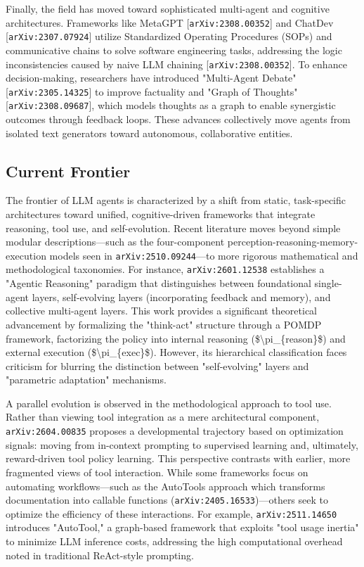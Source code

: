 \documentclass[11pt]{article}
\begin{document}
Finally, the field has moved toward sophisticated multi-agent and cognitive architectures. Frameworks like MetaGPT [\texttt{arXiv:2308.00352}] and ChatDev [\texttt{arXiv:2307.07924}] utilize Standardized Operating Procedures (SOPs) and communicative chains to solve software engineering tasks, addressing the logic inconsistencies caused by naive LLM chaining [\texttt{arXiv:2308.00352}]. To enhance decision-making, researchers have introduced "Multi-Agent Debate" [\texttt{arXiv:2305.14325}] to improve factuality and "Graph of Thoughts" [\texttt{arXiv:2308.09687}], which models thoughts as a graph to enable synergistic outcomes through feedback loops. These advances collectively move agents from isolated text generators toward autonomous, collaborative entities.

\subsection{Current Frontier}

The frontier of LLM agents is characterized by a shift from static, task-specific architectures toward unified, cognitive-driven frameworks that integrate reasoning, tool use, and self-evolution. Recent literature moves beyond simple modular descriptions—such as the four-component perception-reasoning-memory-execution models seen in \texttt{arXiv:2510.09244}—to more rigorous mathematical and methodological taxonomies. For instance, \texttt{arXiv:2601.12538} establishes a "Agentic Reasoning" paradigm that distinguishes between foundational single-agent layers, self-evolving layers (incorporating feedback and memory), and collective multi-agent layers. This work provides a significant theoretical advancement by formalizing the "think-act" structure through a POMDP framework, factorizing the policy into internal reasoning (\$\textbackslash{}pi\_\{reason\}\$) and external execution (\$\textbackslash{}pi\_\{exec\}\$). However, its hierarchical classification faces criticism for blurring the distinction between "self-evolving" layers and "parametric adaptation" mechanisms.

A parallel evolution is observed in the methodological approach to tool use. Rather than viewing tool integration as a mere architectural component, \texttt{arXiv:2604.00835} proposes a developmental trajectory based on optimization signals: moving from in-context prompting to supervised learning and, ultimately, reward-driven tool policy learning. This perspective contrasts with earlier, more fragmented views of tool interaction. While some frameworks focus on automating workflows—such as the AutoTools approach which transforms documentation into callable functions (\texttt{arXiv:2405.16533})—others seek to optimize the efficiency of these interactions. For example, \texttt{arXiv:2511.14650} introduces "AutoTool," a graph-based framework that exploits "tool usage inertia" to minimize LLM inference costs, addressing the high computational overhead noted in traditional ReAct-style prompting.
\end{document}
